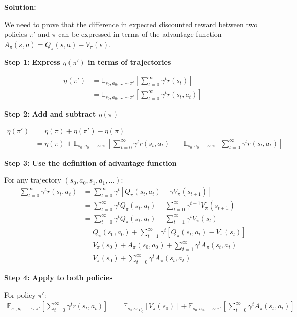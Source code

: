 \textbf{Solution:}

We need to prove that the difference in expected discounted reward between two policies $\pi'$ and $\pi$ can be expressed in terms of the advantage function $A_\pi(s,a) = Q_\pi(s,a) - V_\pi(s)$.

\textbf{Step 1: Express $\eta(\pi')$ in terms of trajectories}

\begin{align}
\eta(\pi') &= \mathbb{E}_{s_0, a_0, \ldots \sim \pi'} \left[ \sum_{t = 0}^{\infty} \gamma^t r(s_t) \right] \\
&= \mathbb{E}_{s_0, a_0, \ldots \sim \pi'} \left[ \sum_{t = 0}^{\infty} \gamma^t r(s_t, a_t) \right]
\end{align}

\textbf{Step 2: Add and subtract $\eta(\pi)$}

\begin{align}
\eta(\pi') &= \eta(\pi) + \eta(\pi') - \eta(\pi) \\
&= \eta(\pi) + \mathbb{E}_{s_0, a_0, \ldots \sim \pi'} \left[ \sum_{t = 0}^{\infty} \gamma^t r(s_t, a_t) \right] - \mathbb{E}_{s_0, a_0, \ldots \sim \pi} \left[ \sum_{t = 0}^{\infty} \gamma^t r(s_t, a_t) \right]
\end{align}

\textbf{Step 3: Use the definition of advantage function}

For any trajectory $(s_0, a_0, s_1, a_1, \ldots)$:
\begin{align}
\sum_{t = 0}^{\infty} \gamma^t r(s_t, a_t) &= \sum_{t = 0}^{\infty} \gamma^t [Q_\pi(s_t, a_t) - \gamma V_\pi(s_{t+1})] \\
&= \sum_{t = 0}^{\infty} \gamma^t Q_\pi(s_t, a_t) - \sum_{t = 0}^{\infty} \gamma^{t+1} V_\pi(s_{t+1}) \\
&= \sum_{t = 0}^{\infty} \gamma^t Q_\pi(s_t, a_t) - \sum_{t = 1}^{\infty} \gamma^t V_\pi(s_t) \\
&= Q_\pi(s_0, a_0) + \sum_{t = 1}^{\infty} \gamma^t [Q_\pi(s_t, a_t) - V_\pi(s_t)] \\
&= V_\pi(s_0) + A_\pi(s_0, a_0) + \sum_{t = 1}^{\infty} \gamma^t A_\pi(s_t, a_t) \\
&= V_\pi(s_0) + \sum_{t = 0}^{\infty} \gamma^t A_\pi(s_t, a_t)
\end{align}

\textbf{Step 4: Apply to both policies}

For policy $\pi'$:
\begin{align}
\mathbb{E}_{s_0, a_0, \ldots \sim \pi'} \left[ \sum_{t = 0}^{\infty} \gamma^t r(s_t, a_t) \right] &= \mathbb{E}_{s_0 \sim \rho_0} [V_\pi(s_0)] + \mathbb{E}_{s_0, a_0, \ldots \sim \pi'} \left[ \sum_{t = 0}^{\infty} \gamma^t A_\pi(s_t, a_t) \right]
\end{align}

